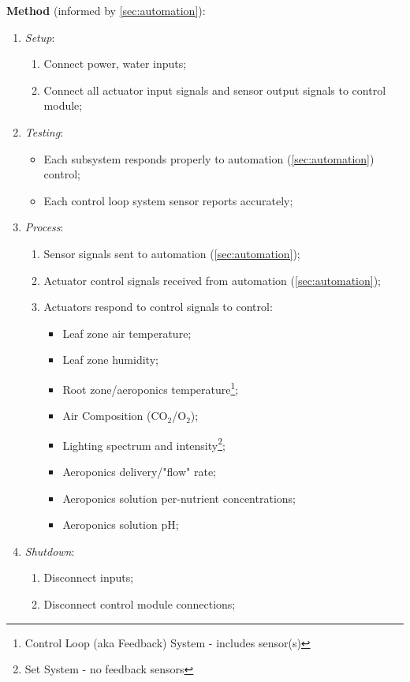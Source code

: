 \documentclass{../tex/report}
\begin{document}
\textbf{Method} (informed by \ref{sec:automation}):
\begin{enumerate}
    \item \textit{Setup}:
    \begin{enumerate}
        \item Connect power, water inputs;
        \item Connect all actuator input signals and sensor output signals to control module;
    \end{enumerate}
    \item \textit{Testing}:
    \begin{itemize}
        \item Each subsystem responds properly to automation (\ref{sec:automation}) control;
        \item Each control loop system sensor reports accurately;
    \end{itemize}
    \item \textit{Process}:
    \begin{enumerate}
        \item Sensor signals sent to automation (\ref{sec:automation});
        \item Actuator control signals received from automation (\ref{sec:automation});
        \item Actuators respond to control signals to control:
        \begin{itemize}
            \item Leaf zone air temperature\footnotemark[4];
            \item Leaf zone humidity\footnotemark[4];
            \item Root zone/aeroponics temperature\footnote{Control Loop (aka Feedback) System - includes sensor(s)};
            \item Air Composition (CO${}_2$/O${}_2$)\footnotemark[4];
            \item Lighting spectrum and intensity\footnote{Set System - no feedback sensors};
            \item Aeroponics delivery/"flow" rate\footnotemark[5];
            \item Aeroponics solution per-nutrient concentrations\footnotemark[5];
            \item Aeroponics solution pH\footnotemark[5];
        \end{itemize}
    \end{enumerate}
    \item \textit{Shutdown}:
    \begin{enumerate}
        \item Disconnect inputs;
        \item Disconnect control module connections;
    \end{enumerate}
\end{enumerate}
\end{document}
